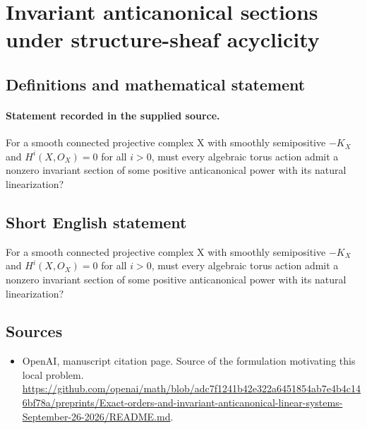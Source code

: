 \documentclass[11pt]{article}
\begin{document}
\section*{Invariant anticanonical sections under structure-sheaf acyclicity}\label{30007064}
\subsection{Definitions and mathematical statement}
\paragraph{Statement recorded in the supplied source.}
For a smooth connected projective complex X with smoothly semipositive $-K_X$ and $H^i(X,O_X)=0$ for all $i>0$, must every algebraic torus action admit a nonzero invariant section of some positive anticanonical power with its natural linearization?
\subsection{Short English statement}
For a smooth connected projective complex X with smoothly semipositive $-K_X$ and $H^i(X,O_X)=0$ for all $i>0$, must every algebraic torus action admit a nonzero invariant section of some positive anticanonical power with its natural linearization?
\subsection{Sources}
\begin{itemize}
\item[S1] OpenAI, manuscript citation page. Source of the formulation motivating this local problem.
\url{https://github.com/openai/math/blob/adc7f1241b42e322a6451854ab7e4b4c146bf78a/preprints/Exact-orders-and-invariant-anticanonical-linear-systems-September-26-2026/README.md}.
\end{itemize}
\end{document}
